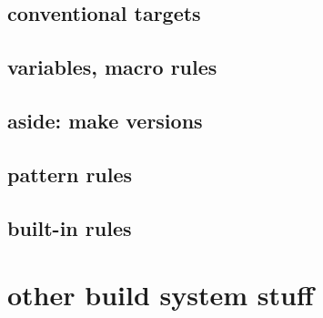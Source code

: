 

\subsection{conventional targets}



\subsection{variables, macro rules}



\subsection{aside: make versions}



\subsection{pattern rules}



\subsection{built-in rules}



\section{other build system stuff}



